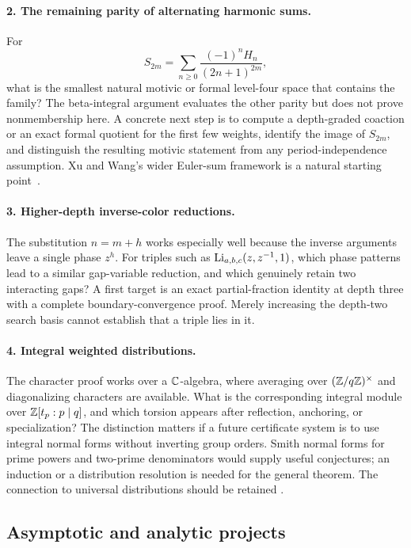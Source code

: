 \paragraph{2. The remaining parity of alternating harmonic sums.}
For
\[
S_{2m}=\sum_{n\ge0}\frac{(-1)^nH_n}{(2n+1)^{2m}},
\]
what is the smallest natural motivic or formal level-four space that
contains the family? The beta-integral argument evaluates the other
parity but does not prove nonmembership here. A concrete next step is
to compute a depth-graded coaction or an exact formal quotient for the
first few weights, identify the image of \(S_{2m}\), and distinguish
the resulting motivic statement from any period-independence
assumption. Xu and Wang's wider Euler-sum framework is a natural
starting point~\cite{XuWang}.

\paragraph{3. Higher-depth inverse-color reductions.}
The substitution \(n=m+h\) works especially well because the inverse
arguments leave a single phase \(z^h\). For triples such as
\(\operatorname{Li}_{a,b,c}(z,z^{-1},1)\), which phase patterns lead to a similar
gap-variable reduction, and which genuinely retain two interacting
gaps? A first target is an exact partial-fraction identity at depth
three with a complete boundary-convergence proof. Merely increasing
the depth-two search basis cannot establish that a triple lies in it.

\paragraph{4. Integral weighted distributions.}
The character proof works over a \(\mathbb{C}\)-algebra, where averaging over
\((\mathbb{Z}/q\mathbb{Z})^\times\) and diagonalizing characters are available.
What is the corresponding integral module over
\(\mathbb{Z}[t_p:p\mid q]\), and which torsion appears after reflection,
anchoring, or specialization? The distinction matters if a future
certificate system is to use integral normal forms without inverting
group orders. Smith normal forms for prime powers and two-prime
denominators would supply useful conjectures; an induction or a
distribution resolution is needed for the general theorem.
The connection to universal distributions should be retained
\cite{Kubert,Ouyang}.

\subsection{Asymptotic and analytic projects}

